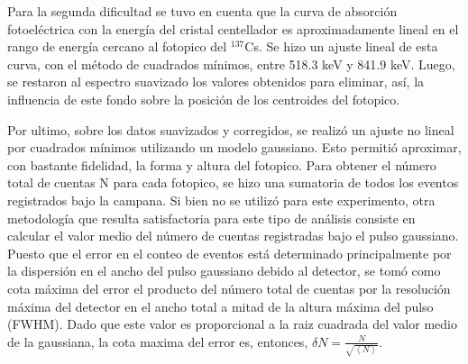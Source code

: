 \documentclass[twoside]{article}
\begin{document}
\begin{multicols}{2}
Para la segunda dificultad se tuvo en cuenta que la curva de absorción fotoeléctrica con la energía del cristal centellador es aproximadamente lineal en el rango de energía cercano al fotopico del ${^{137}}$Cs. Se hizo un ajuste lineal de esta curva, con el método de cuadrados mínimos, entre 518.3 keV y 841.9 keV. Luego, se restaron al espectro suavizado los valores obtenidos para eliminar, así, la influencia de este fondo sobre la posición de los centroides del fotopico.

Por ultimo, sobre los datos suavizados y corregidos, se realizó un ajuste no lineal por cuadrados mínimos utilizando un modelo gaussiano. Esto permitió aproximar, con bastante fidelidad, la forma y altura del fotopico. Para obtener el número total de cuentas N para cada fotopico, se hizo una sumatoria de todos los eventos registrados bajo la campana. Si bien no se utilizó para este experimento, otra metodología que resulta satisfactoria para este tipo de análisis consiste en calcular el valor medio del número de cuentas registradas bajo el pulso gaussiano. Puesto que el error en el conteo de eventos está determinado principalmente por la dispersión en el ancho del pulso gaussiano debido al detector, se tomó como cota máxima del error el producto del número total de cuentas por la resolución máxima del detector en el ancho total a mitad de la altura máxima del pulso (FWHM). Dado que este valor es proporcional a la raiz cuadrada del valor medio de la gaussiana{\cite{Ortec-Gamma-Ray}}, la cota maxima del error es, entonces, ${\delta N = \frac{N}{\sqrt{ \left\langle N \right\rangle }}  }$.


\end{multicols}
\end{document}
